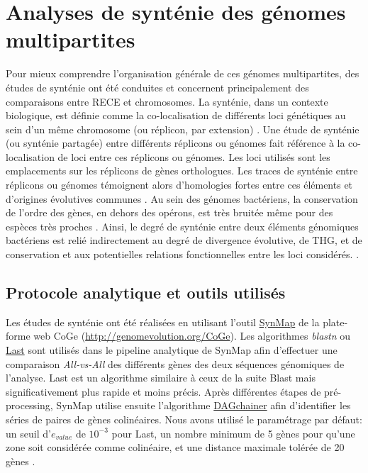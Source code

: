 \section{Analyses de synténie des génomes multipartites}
		Pour mieux comprendre l'organisation générale de ces génomes multipartites, des études de synténie ont été conduites et concernent principalement des comparaisons entre RECE et chromosomes. La synténie, dans un contexte biologique, est définie comme la co-localisation de différents loci génétiques au sein d'un même chromosome (ou réplicon, par extension) \citep{renwick1971rhesus}. Une étude de synténie (ou synténie partagée) entre différents réplicons ou génomes fait référence à la co-localisation de loci entre ces réplicons ou génomes. Les loci utilisés sont les emplacements sur les réplicons de gènes orthologues. Les traces de synténie entre réplicons ou génomes témoignent alors d'homologies fortes entre ces éléments et d'origines évolutives communes \citep{Roberts2008,Landeta2011}. Au sein des génomes bactériens, la conservation de l'ordre des gènes, en dehors des opérons, est très bruitée même pour des espèces très proches \citep{wolf2001genome}. Ainsi, le degré de synténie entre deux éléments génomiques bactériens est relié indirectement au degré de divergence évolutive, de THG, et de conservation et aux potentielles relations fonctionnelles entre les loci considérés. \citep{harrison2011bacterial}.
  
\subsection{Protocole analytique et outils utilisés}
		Les études de synténie ont été réalisées en utilisant l'outil \href{http://genomevolution.org/CoGe/SynMap.pl}{SynMap} de la plate-forme web CoGe (\url{http://genomevolution.org/CoGe}). Les algorithmes \textit{blastn} \citep{Camacho2009} ou \href{http://last.cbrc.jp/}{Last} \citep{kielbasa2011adaptive} sont utilisés dans le pipeline analytique de SynMap afin d'effectuer une comparaison \textit{All-vs-All} des différents gènes des deux séquences génomiques de l'analyse. Last est un algorithme similaire à ceux de la suite Blast mais significativement plus rapide et moins précis. Après différentes étapes de pré-processing, SynMap utilise ensuite l'algorithme \href{http://dagchainer.sourceforge.net/}{DAGchainer} \citep{haas2004dagchainer} afin d'identifier les séries de paires de gènes colinéaires. Nous avons utilisé le paramétrage par défaut: un seuil d'$e_{value}$ de $10^{-3}$ pour Last, un nombre minimum de 5 gènes pour qu'une zone soit considérée comme colinéaire, et une distance maximale tolérée de 20 gènes \citep{haas2004dagchainer}.
   
